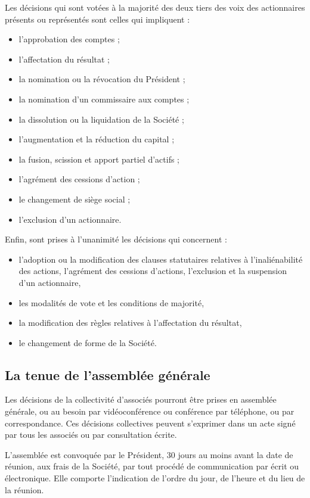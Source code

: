 \documentclass[a4paper,12pt]{report}
\begin{document}
Les décisions qui sont votées à la majorité des deux tiers des voix des actionnaires présents ou représentés sont celles qui impliquent :
\begin{itemize}
	\item l'approbation des comptes ;
	\item l'affectation du résultat ;
	\item la nomination ou la révocation du Président ;
	\item la nomination d'un commissaire aux comptes ;
	\item la dissolution ou la liquidation de la Société ;
	\item l'augmentation et la réduction du capital ;
	\item la fusion, scission et apport partiel d'actifs ;
	\item l'agrément des cessions d'action ;
	\item le changement de siège social ;
	\item l'exclusion d'un actionnaire.
\end{itemize}

Enfin, sont prises à l'unanimité les décisions qui concernent :
\begin{itemize}
	\item l'adoption ou la modification des clauses statutaires relatives à l'inaliénabilité des actions, l'agrément des cessions d'actions, l'exclusion et la suspension d'un actionnaire,
	\item les modalités de vote et les conditions de majorité,
	\item la modification des règles relatives à l'affectation du résultat,
	\item le changement de forme de la Société.
\end{itemize}

\subsection{La tenue de l'assemblée générale}
Les décisions de la collectivité d'associés pourront être prises en assemblée générale, ou au besoin par vidéoconférence ou conférence par téléphone, ou par correspondance. Ces décisions collectives peuvent s'exprimer dans un acte signé par tous les associés ou par consultation écrite.

L'assemblée est convoquée par le Président, 30 jours au moins avant la date de réunion, aux frais de la Société, par tout procédé de communication par écrit ou électronique. Elle comporte l'indication de l'ordre du jour, de l'heure et du lieu de la réunion.
\end{document}
